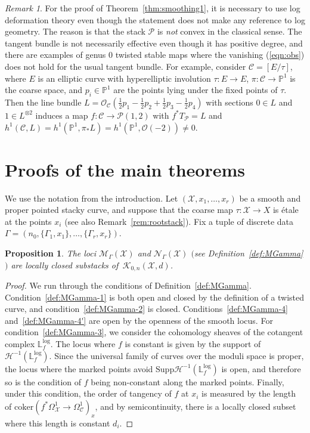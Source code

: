 \documentclass[11pt]{amsart}
\numberwithin{equation}{section}
\newtheorem{proposition}[theorem]{Proposition}
\theoremstyle{definition}
\theoremstyle{remark}
\newtheorem{remark}[theorem]{Remark}
\newcommand{\bP}{{\mathbb P}}
\newcommand{\bLl}{\mathbb L^{\mathrm{log}}}
\newcommand{\calK}{\mathcal K}
\newcommand{\calO}{\mathcal O}
\newcommand{\calM}{\mathcal M}
\newcommand{\calH}{\mathcal H}
\newcommand{\calN}{\mathcal N}
\newcommand{\calX}{\mathcal X}
\newcommand{\calC}{\mathcal C}
\newcommand{\calP}{\mathcal P}
\newcommand{\Supp}{\mathrm{Supp}}
\begin{document}
\begin{remark}\label{rem:needlog} For the proof of Theorem~\ref{thm:smoothing1}, it is necessary to use log deformation theory even though the statement does not make any reference to log geometry. The reason is that the stack $\calP$ is \emph{not} convex in the classical sense. The tangent bundle is not necessarily effective even though it has positive degree, and there are examples of genus $0$ twisted stable maps where the vanishing (\ref{eqn:obs}) does not hold for the usual tangent bundle. For example, consider $\calC = [E/\tau]$, where $E$ is an elliptic curve with hyperelliptic involution $\tau \colon  E \to E$, $\pi \colon  \calC \to \bP^1$ is the coarse space, and $p_i \in \bP^1$ are the points lying under the fixed points of $\tau$. Then the line bundle $L = \calO_{\calC}\left(\frac{1}{2}p_1 - \frac{1}{2}p_2 + \frac{1}{2}p_3 - \frac{1}{2}p_4\right)$ with sections $0 \in L$ and $1 \in L^{\otimes 2}$ induces a map $f \colon  \calC \to \calP(1,2)$ with $f^*T_{\calP} = L$ and $h^1(\calC, L) = h^1(\bP^1, \pi_*L) = h^1(\bP^1, \calO(-2)) \neq 0$. 
\end{remark}

\section{Proofs of the main theorems}

We use the notation from the introduction. Let $(\calX, x_1, \ldots, x_r)$ be a smooth and proper pointed stacky curve, and suppose that the coarse map $\tau \colon  \calX \to X$ is \'etale at the points $x_i$ (see also Remark~\ref{rem:rootstack}). Fix a tuple of discrete data $\Gamma = (n_0, \{\Gamma_1, x_1\}, \ldots, \{\Gamma_r, x_r\})$. 

\begin{proposition} The loci $\calM_\Gamma(\calX)$ and $\calN_{\Gamma}(\calX)$ $($see Definition~\ref{def:MGamma}\,$)$ are locally closed substacks of\, $\calK_{0,n}(\calX, d)$. 
\end{proposition} 

\begin{proof} We run through the conditions of Definition~\ref{def:MGamma}. Condition~\eqref{def:MGamma-1} is both open and closed by the definition of a twisted curve, and condition~\eqref{def:MGamma-2} is closed. Conditions~\eqref{def:MGamma-4} and~\eqref{def:MGamma-4'} are open by the openness of the smooth locus. For condition~\eqref{def:MGamma-3}, we consider the cohomology sheaves of the cotangent complex $\bLl_f$. The locus where $f$ is constant is given by the support of $\calH^{-1}(\bLl_f)$. Since the universal family of curves over the moduli space is proper, the locus where the marked points avoid $\Supp \calH^{-1}(\bLl_f)$ is open, and therefore so is the condition of $f$ being non-constant along the marked points.
  Finally, under this condition, the order of tangency of $f$ at $x_i$ is measured by the length of $\mathrm{coker}(f^*\Omega^1_\calX \to \Omega^1_\calC)_x$, and by semicontinuity, there is a locally closed subset where this length is constant $d_i$. 
\end{proof} 
\end{document}
